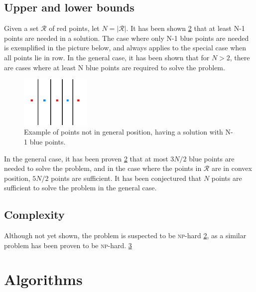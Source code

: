 \documentclass[a4paper,12pt]{article}
\begin{document}
\subsection{Upper and lower bounds}
Given a set $\mathcal{R}$ of red points, let $N = |\mathcal{R}|$. It has been shown \hyperref[ref:blocking]{2} that at least N-1 points are needed in a solution. The case where only N-1 blue points are needed is exemplified in the picture below, and always applies to the special case when all points lie in row. In the general case, it has been shown that for $N>2$, there are cases where at least N blue points are required to solve the problem.

\begin{figure}[hb]
\centering
\includegraphics[width=0.3\textwidth]{pictures/N-1solution.png}
 \caption[Close up of \textit{Hemidactylus} sp.]
{Example of points not in general position, having a solution with N-1 blue points.}
\end{figure}

In the general case, it has been proven \hyperref[ref:blocking]{2} that at most $3N/2$ blue points are needed to solve the problem, and in the case where the points in  $\mathcal{R}$ are in convex position, $5N/2$ points are sufficient. It has been conjectured that $N$ points are sufficient to solve the problem in the general case.


\subsection{Complexity}
Although not yet shown, the problem is suspected to be \textsc{np}-hard \hyperref[ref:blocking]{2}, as a similar problem has been proven to be \textsc{np}-hard. \hyperref[ref:alexander]{3}

\section{Algorithms}
\end{document}
